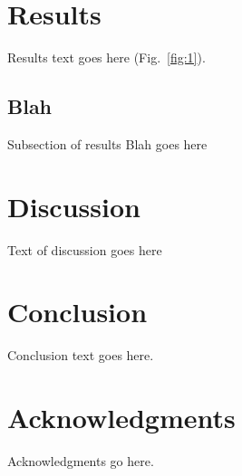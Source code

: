 \documentclass[11pt,a4paper]{article}
\begin{document}
\section*{Results}

Results text goes here 
(Fig.~\ref{fig:1}).
\subsection*{Blah}
Subsection of results Blah goes here


\section*{Discussion}

Text of discussion goes here


\section*{Conclusion}

Conclusion text goes here.
\lipsum[5]


\section*{Acknowledgments}

Acknowledgments go here.

\newpage


\end{document}
